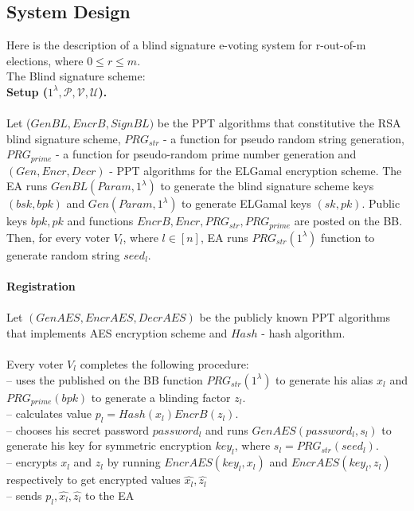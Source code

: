 \subsection{System Design}
Here is the description of a blind signature e-voting system for r-out-of-m elections, where $0\leq r\leq m$.\\
The Blind signature scheme:\\ 
\textbf{Setup ($1^{\lambda}, \mathcal{P}, \mathcal{V}, \mathcal{U}$).}\\\\
Let ($GenBL, EncrB, SignBL)$ be the PPT algorithms that constitutive the RSA blind signature scheme,  $PRG_{str}$  - a function for pseudo random string generation, $PRG_{prime}$  - a function for pseudo-random prime number generation and $(Gen, Encr, Decr)$ - PPT algorithms for the ELGamal encryption scheme. The EA runs $GenBL(Param, 1^{\lambda})$ to generate the blind signature scheme keys $(bsk, bpk)$ and $Gen(Param, 1^{\lambda})$ to generate ELGamal keys $(sk,pk)$. Public keys $bpk,pk$ and functions $EncrB,Encr, PRG_{str}, PRG_{prime}$ are posted on the BB.\\
Then, for every voter $V_l$, where $l \in [n]$, EA runs $PRG_{str}(1^{\lambda})$ function to generate random string $seed_l$.\\\\
\textbf{Registration}\\\\
Let $(GenAES, EncrAES, DecrAES)$ be the publicly known PPT algorithms that implements AES encryption scheme and $Hash$ - hash algorithm.  \\\\
Every voter $V_l$ completes the following procedure: \\
--  uses the published on the BB function $PRG_{str}(1^{\lambda})$ to generate his alias $x_l$ and  $PRG_{prime}(bpk)$ to generate a blinding factor $z_l$. \\
-- calculates value $p_l = Hash(x_l)EncrB(z_l)$.\\
--  chooses his secret password $password_l$ and runs  $ GenAES(password_l, s_l)$ to generate his key for symmetric encryption $key_l$, where $s_l = PRG_{str}(seed_l)$.\\
--  encrypts $x_l$ and $z_l$ by running  $EncrAES(key_l,x_l)$ and $EncrAES(key_l,z_l)$ respectively to get encrypted values $\hat{x_l},\hat{z_l}$\\
-- sends $p_l,\hat{x_l},\hat{z_l}$ to the EA\\\\

